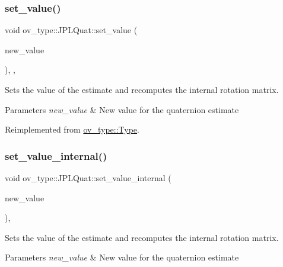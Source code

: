 \subsubsection{\texorpdfstring{set\+\_\+value()}{set\_value()}}
{\footnotesize\ttfamily void ov\+\_\+type\+::\+J\+P\+L\+Quat\+::set\+\_\+value (\begin{DoxyParamCaption}\item[{const Eigen\+::\+Matrix\+Xd \&}]{new\+\_\+value }\end{DoxyParamCaption})\hspace{0.3cm}{\ttfamily [inline]}, {\ttfamily [override]}, {\ttfamily [virtual]}}



Sets the value of the estimate and recomputes the internal rotation matrix. 


\begin{DoxyParams}{Parameters}
{\em new\+\_\+value} & New value for the quaternion estimate \\
\hline
\end{DoxyParams}


Reimplemented from \hyperlink{classov__type_1_1Type_a81c73f0b6c10f2550a487019a59796a9}{ov\+\_\+type\+::\+Type}.

\mbox{\label{classov__type_1_1JPLQuat_a0ea10a064e10b3788ec541cf667c8e99}} 
\subsubsection{\texorpdfstring{set\+\_\+value\+\_\+internal()}{set\_value\_internal()}}
{\footnotesize\ttfamily void ov\+\_\+type\+::\+J\+P\+L\+Quat\+::set\+\_\+value\+\_\+internal (\begin{DoxyParamCaption}\item[{const Eigen\+::\+Matrix\+Xd \&}]{new\+\_\+value }\end{DoxyParamCaption})\hspace{0.3cm}{\ttfamily [inline]}, {\ttfamily [protected]}}



Sets the value of the estimate and recomputes the internal rotation matrix. 


\begin{DoxyParams}{Parameters}
{\em new\+\_\+value} & New value for the quaternion estimate \\
\hline
\end{DoxyParams}
\mbox{\label{classov__type_1_1JPLQuat_af0a26f1b03bc7c89abad5dfd985c61cd}} 
